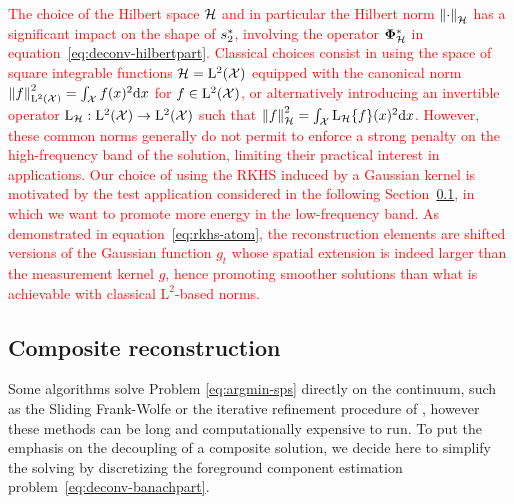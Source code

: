 \documentclass[12pt]{article}
\begin{document}
        \textcolor{red}{
        \begin{remark}
            The choice of the Hilbert space $\mathcal{H}$ and in particular the Hilbert norm $\left\lVert\cdot\right\rVert_{\mathcal{H}}$ has a significant impact on the shape of $s_2^*$, involving the operator $\bm{\Phi}_\mathcal{H}^*$ in equation~\eqref{eq:deconv-hilbertpart}. Classical choices consist in using the space of square integrable functions $\mathcal{H} = \mathrm{L}^2(\mathcal{X})$ equipped with the canonical norm $\left\lVert f\right\rVert_{\mathrm{L}^2(\mathcal{X})}^2 = \int_{\mathcal{X}} f(x)^2 \mathrm{d}x$ for $f \in \mathrm{L}^2(\mathcal{X})$, or alternatively introducing an invertible operator $\mathrm{L}_{\mathcal{H}}: \mathrm{L}^2(\mathcal{X}) \to \mathrm{L}^2(\mathcal{X})$ such that $\left\lVert f\right\rVert_{\mathcal{H}}^2 = \int_{\mathcal{X}} \mathrm{L}_{\mathcal{H}}\{f\}(x)^2 \mathrm{d}x $. However, these common norms generally do not permit to enforce a strong penalty on the high-frequency band of the solution, limiting their practical interest in applications.
            Our choice of using the RKHS induced by a Gaussian kernel is motivated by the test application considered in the following Section~\ref{sec:comp:reco}, in which we want to promote more energy in the low-frequency band. As demonstrated in equation~\ref{eq:rkhs-atom}, the reconstruction elements are shifted versions of the Gaussian function $g_t$ whose spatial extension is indeed larger than the measurement kernel $g$, hence promoting smoother solutions than what is achievable with classical $\mathrm{L}^2$-based norms.
        \end{remark}
        }
        
        
    \subsection{Composite reconstruction}
    \label{sec:comp:reco}

        Some algorithms solve Problem \eqref{eq:argmin-sps}  directly on the continuum, such as the Sliding Frank-Wolfe \cite{denoyelle2019sliding} or the iterative refinement procedure of \cite{flinth2023grid}, however these methods can be long and computationally expensive to run.
        To put the emphasis on the decoupling of a composite solution, we decide here to simplify the solving by discretizing the foreground component estimation problem~\eqref{eq:deconv-banachpart}.
        
\end{document}
